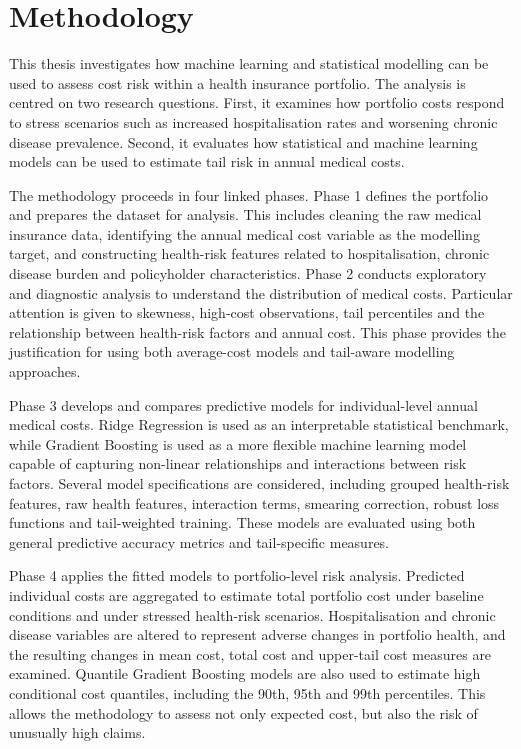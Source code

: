\documentclass[11pt]{article}
\begin{document}
    
    \newpage
    
    \newpage

    \tableofcontents
    \newpage

    \setcounter{page}{1}


    \section{Methodology}
    
    This thesis investigates how machine learning and statistical modelling can be used to assess cost risk within a health insurance portfolio. The analysis is centred on two research questions. First, it examines how portfolio costs respond to stress scenarios such as increased hospitalisation rates and worsening chronic disease prevalence. Second, it evaluates how statistical and machine learning models can be used to estimate tail risk in annual medical costs.
    
    The methodology proceeds in four linked phases. Phase 1 defines the portfolio and prepares the dataset for analysis. This includes cleaning the raw medical insurance data, identifying the annual medical cost variable as the modelling target, and constructing health-risk features related to hospitalisation, chronic disease burden and policyholder characteristics. Phase 2 conducts exploratory and diagnostic analysis to understand the distribution of medical costs. Particular attention is given to skewness, high-cost observations, tail percentiles and the relationship between health-risk factors and annual cost. This phase provides the justification for using both average-cost models and tail-aware modelling approaches.
    
    Phase 3 develops and compares predictive models for individual-level annual medical costs. Ridge Regression is used as an interpretable statistical benchmark, while Gradient Boosting is used as a more flexible machine learning model capable of capturing non-linear relationships and interactions between risk factors. Several model specifications are considered, including grouped health-risk features, raw health features, interaction terms, smearing correction, robust loss functions and tail-weighted training. These models are evaluated using both general predictive accuracy metrics and tail-specific measures.
    
    Phase 4 applies the fitted models to portfolio-level risk analysis. Predicted individual costs are aggregated to estimate total portfolio cost under baseline conditions and under stressed health-risk scenarios. Hospitalisation and chronic disease variables are altered to represent adverse changes in portfolio health, and the resulting changes in mean cost, total cost and upper-tail cost measures are examined. Quantile Gradient Boosting models are also used to estimate high conditional cost quantiles, including the 90th, 95th and 99th percentiles. This allows the methodology to assess not only expected cost, but also the risk of unusually high claims.
    
\end{document}
